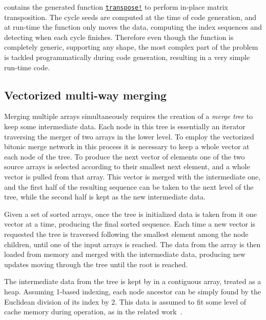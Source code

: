 \documentclass{juliacon}
\begin{document}
\chipsort contains the generated function \href{https://github.com/nlw0/ChipSort.jl/blob/10eb1a962e720aee2bf8733c832468b51a782c1a/src/transpose-vecs.jl#L19}{\tt transpose!} to perform in-place matrix transposition. The cycle seeds are computed at the time of code generation, and at run-time the function only moves the data, computing the index sequences and detecting when each cycle finishes. Therefore even though the function is completely generic, supporting any shape, the most complex part of the problem is tackled programmatically during code generation, resulting in a very simple run-time code.

\subsection{Vectorized multi-way merging}
%
Merging multiple arrays simultaneously requires the creation of a {\em merge tree} to keep some intermediate data. Each node in this tree is essentially an iterator traversing the merger of two arrays in the lower level. To employ the vectorized bitonic merge network in this process it is necessary to keep a whole vector at each node of the tree. To produce the next vector of elements one of the two source arrays is selected according to their smallest next element, and a whole vector is pulled from that array. This vector is merged with the intermediate one, and the first half of the resulting sequence can be taken to the next level of the tree, while the second half is kept as the new intermediate data.

Given a set of sorted arrays, once the tree is initialized data is taken from it one vector at a time, producing the final sorted sequence. Each time a new vector is requested the tree is traversed following the smallest element among the node children, until one of the input arrays is reached. The data from the array is then loaded from memory and merged with the intermediate data, producing new updates moving through the tree until the root is reached.

The intermediate data from the tree is kept by \chipsort in a contiguous array, treated as a heap. Assuming 1-based indexing, each node ancestor can be simply found by the Euclidean division of its index by 2. This data is assumed to fit some level of cache memory during operation, as in the related work~\cite{DBLP:conf/IEEEpact/InoueMKN07,DBLP:journals/pvldb/ChhuganiNLMHCBKD08,DBLP:journals/pvldb/InoueT15}.
\end{document}
